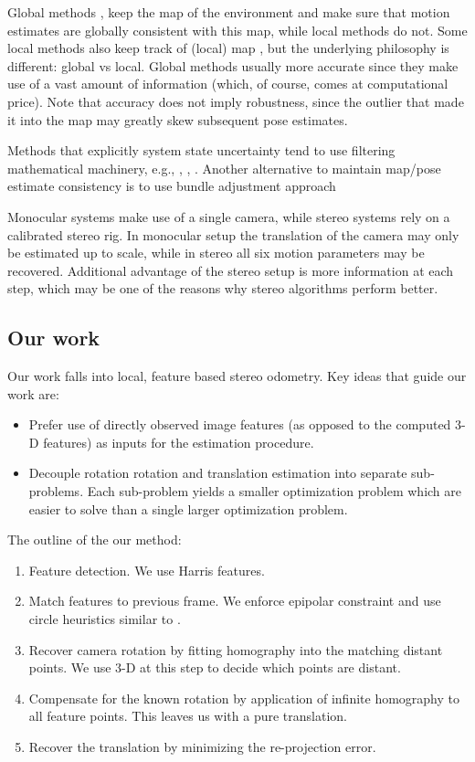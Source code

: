 \documentclass[MSc,beforeExam]{iitcsthesis}
\begin{document}
Global methods \cite{Klein2007}, \cite{Newcombe2011} keep the map of
the environment and make sure that motion estimates are globally
consistent with this map, while local methods do not.  Some local
methods \cite{Badino2013} also keep track of (local) map , but the
underlying philosophy is different: global vs local.  Global methods
usually more accurate since they make use of a vast amount of
information (which, of course, comes at computational price).  Note
that accuracy does not imply robustness, since the outlier that made
it into the map may greatly skew subsequent pose estimates.

Methods that explicitly system state uncertainty tend to use filtering
mathematical machinery, e.g., \cite{Konolige2010}, \cite{Olson2003},
\cite{Kaess2008}.  Another alternative to maintain map/pose estimate
consistency is to use bundle adjustment approach \cite{Triggs2000}

Monocular systems \cite{Song} make use of a single camera, while
stereo systems \cite{Geiger2011} rely on a calibrated stereo rig. In
monocular setup the translation of the camera may only be estimated up
to scale, while in stereo all six motion parameters may be
recovered. Additional advantage of the stereo setup is more
information at each step, which may be one of the reasons why stereo
algorithms perform better.

\subsection{Our work}

Our work falls into local, feature based stereo odometry. Key ideas
that guide our work are:
\begin{itemize}
\item Prefer use of directly observed image features (as opposed to
  the computed 3-D features) as inputs for the estimation procedure.
\item Decouple rotation rotation and translation estimation into
  separate sub-problems.  Each sub-problem yields a smaller
  optimization problem which are easier to solve than a single larger
  optimization problem.
\end{itemize}

The outline of the our method:
\begin{enumerate}
\item Feature detection.  We use Harris \cite{Harris1987} features.
\item Match features to previous frame. We enforce epipolar constraint
  and use circle heuristics similar to \cite{Geiger2011}.
\item Recover camera rotation by fitting homography into the matching
  distant points.  We use 3-D at this step to decide which points are
  distant.
\item Compensate for the known rotation by application of infinite
  homography to all feature points.  This leaves us with a pure
  translation.
\item Recover the translation by minimizing the re-projection error.
\end{enumerate}
\end{document}
